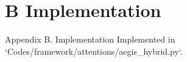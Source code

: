 \section{B Implementation}

 Appendix B. Implementation
Implemented in `Codes/framework/attentions/aegis\_hybrid.py`.
